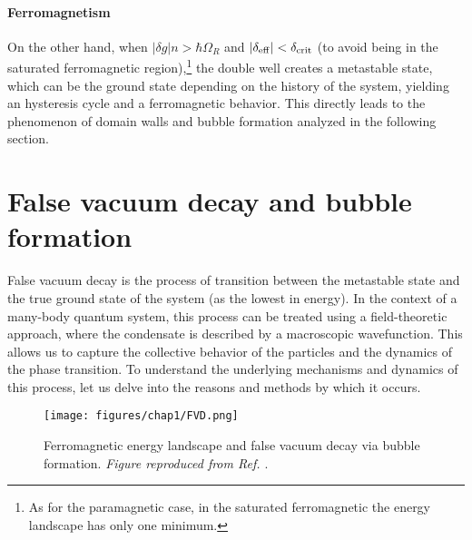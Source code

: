 \paragraph{Ferromagnetism}
On the other hand, when $|\delta g|n > \hbar\Omega_R$ and $|\delta_{\rm eff}| < \delta_{\rm crit}$ (to avoid being in the saturated ferromagnetic region),\footnote{As for the paramagnetic case, in the saturated ferromagnetic the energy landscape has only one minimum.} the double well creates a metastable state, which can be the ground state depending on the history of the system, yielding an hysteresis cycle and a ferromagnetic behavior. 
This directly leads to the phenomenon of domain walls and bubble formation analyzed in the following section.


\section{False vacuum decay and bubble formation}
\label{sec:FVD}
False vacuum decay is the process of transition between the metastable state and the true ground state of the system (as the lowest in energy). In the context of a many-body quantum system, this process can be treated using a field-theoretic approach, where the condensate is described by a macroscopic wavefunction. This allows us to capture the collective behavior of the particles and the dynamics of the phase transition. 
To understand the underlying mechanisms and dynamics of this process, let us delve into the reasons and methods by which it occurs.

\begin{figure}[ht!]
    \centering
    \texttt{[image: figures/chap1/FVD.png]}
    \caption{Ferromagnetic energy landscape and false vacuum decay via bubble formation. \emph{Figure reproduced from Ref. \cite{zenesini2024false}}.}
    \label{fig:FVD}
\end{figure}

